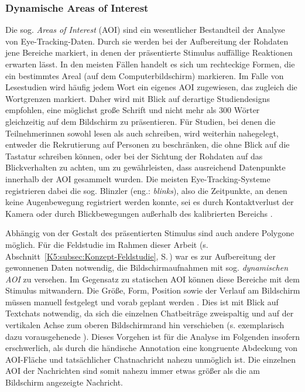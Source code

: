 
\subsubsection{Dynamische Areas of Interest}
\label{K5:subsubsec:DynAOI}


Die sog. \emph{Areas of Interest} (AOI) sind ein wesentlicher Bestandteil der Analyse von Eye-Tracking-Daten. Durch sie werden bei der Aufbereitung der Rohdaten jene Bereiche markiert, in denen der präsentierte Stimulus auffällige Reaktionen erwarten lässt. In den meisten Fällen handelt es sich um rechteckige Formen, die ein bestimmtes Areal (auf dem Computerbildschirm) markieren. Im Falle von Lesestudien wird häufig jedem Wort ein eigenes AOI zugewiesen, das zugleich die Wortgrenzen markiert. Daher wird mit Blick auf derartige Studiendesigns empfohlen, eine möglichst große Schrift und nicht mehr als 300 Wörter gleichzeitig auf dem Bildschirm zu präsentieren. Für Studien, bei denen die Teilnehmer{\textperiodcentered}innen sowohl lesen als auch schreiben, wird weiterhin nahegelegt, entweder die Rekrutierung auf Personen zu beschränken, die ohne Blick auf die Tastatur schreiben können, oder bei der Sichtung der Rohdaten auf das Blickverhalten zu achten, um zu gewährleisten, dass ausreichend Datenpunkte innerhalb der AOI gesammelt wurden. Die meisten Eye-Tracking-Systeme registrieren dabei die sog. Blinzler (eng.: \emph{blinks}), also die Zeitpunkte, an denen keine Augenbewegung registriert werden konnte, sei es durch Kontaktverlust der Kamera oder durch Blickbewegungen außerhalb des kalibrierten Bereichs \citep[253\psqq]{obrien_eye_2009}.

Abhängig von der Gestalt des präsentierten Stimulus sind auch andere Polygone möglich. Für die Feldstudie im Rahmen dieser Arbeit (s. Abschnitt~\ref{K5:subsec:Konzept-Feldstudie}, S.\,\pageref{K5:subsec:Konzept-Feldstudie}) war es zur Aufbereitung der gewonnenen Daten notwendig, die Bildschirmaufnahmen mit sog. \emph{dynamischen AOI} zu versehen. Im Gegensatz zu statischen AOI können diese Bereiche mit dem Stimulus \glqq mitwandern\grqq. Die Größe, Form, Position sowie der Verlauf am Bildschirm müssen manuell festgelegt und vorab geplant werden \citep[209]{holmqvist_eye_2011}. Dies ist mit Blick auf Textchats notwendig, da sich die einzelnen Chatbeiträge zweispaltig und auf der vertikalen Achse zum oberen Bildschirmrand hin verschieben (s. exemplarisch dazu vorausgehenede ). Dieses Vorgehen ist für die Analyse im Folgenden insofern erschwerlich, als durch die händische Annotation eine kongruente Abdeckung von AOI-Fläche und tatsächlicher Chatnachricht nahezu unmöglich ist. Die einzelnen AOI der Nachrichten sind somit nahezu immer etwas größer als die am Bildschirm angezeigte Nachricht.

